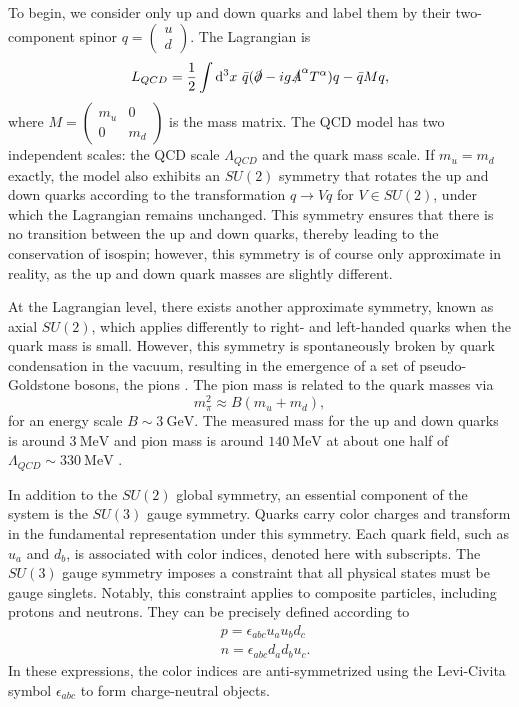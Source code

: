 \documentclass[11pt,english]{article}
\newcommand{\dee}{\mathrm{d}}
\newcommand{\GeV}{\mathrm{GeV}}
\newcommand{\MeV}{\mathrm{MeV}}
\begin{document}
To begin, we consider only up and down quarks and label them by their two-component spinor $q=\begin{pmatrix}
u \\
d
\end{pmatrix}$.  The Lagrangian is
\begin{equation}\label{eqqcd}
    L_{QCD}=\frac{1}{2}\int \dee^3 x\ \bar{q}(\slashed{\partial}-ig\slashed{A}^{\alpha}T^{\alpha})q-\bar{q}M q,
\end{equation}
where $M=\begin{pmatrix} m_u & 0\\ 0 & m_d\end{pmatrix}$ is the mass matrix. The QCD model has two independent scales: the QCD scale $\Lambda_{QCD}$ and the quark mass scale. If $m_u=m_d$ exactly, the model also exhibits an $SU(2)$ symmetry that rotates the up and down quarks according to the transformation $q\rightarrow Vq$ for $V\in SU(2)$, under which the Lagrangian remains unchanged.
This symmetry ensures that there is no transition between the up and down quarks, thereby leading to the conservation of isospin; however, this symmetry is of course only approximate in reality, as the up and down quark masses are slightly different.



At the Lagrangian level, there exists another approximate symmetry, known as axial $SU(2)$, which applies differently to right- and left-handed quarks when the quark mass is small. However, this symmetry is spontaneously broken by quark condensation in the vacuum, resulting in the emergence of a set of pseudo-Goldstone bosons, the pions \cite{Gell-Mann:1960mvl}. The pion mass is related to the quark masses via \cite{PhysRev.175.2195}
\begin{equation}
    m_{\pi}^2\approx B(m_u+m_d),
\end{equation}
for an energy scale $B \sim 3~\GeV$. The measured mass for the up and down quarks is around $3~\MeV$ and pion mass is around $140~\MeV$ at about one half of $\Lambda_{QCD} \sim 330~\MeV$ \cite{10.1093/ptep/ptaa104}. 

 


In addition to the $SU(2)$ global symmetry, an essential component of the system is the $SU(3)$ gauge symmetry. Quarks carry color charges and transform in the fundamental representation under this symmetry. Each quark field, such as $u_a$ and $d_b$, is associated with color indices, denoted here with subscripts.  The $SU(3)$ gauge symmetry imposes a constraint that all physical states must be gauge singlets.  Notably, this constraint applies to composite particles, including protons and neutrons. They can be precisely defined according to
\begin{equation}
\begin{split}
    &p=\epsilon_{abc}u_au_bd_c\\
    &n=\epsilon_{abc}d_ad_bu_c.
\end{split}
\end{equation}
In these expressions, the color indices are anti-symmetrized using the Levi-Civita symbol $\epsilon_{abc}$ to form charge-neutral objects.  
\end{document}
